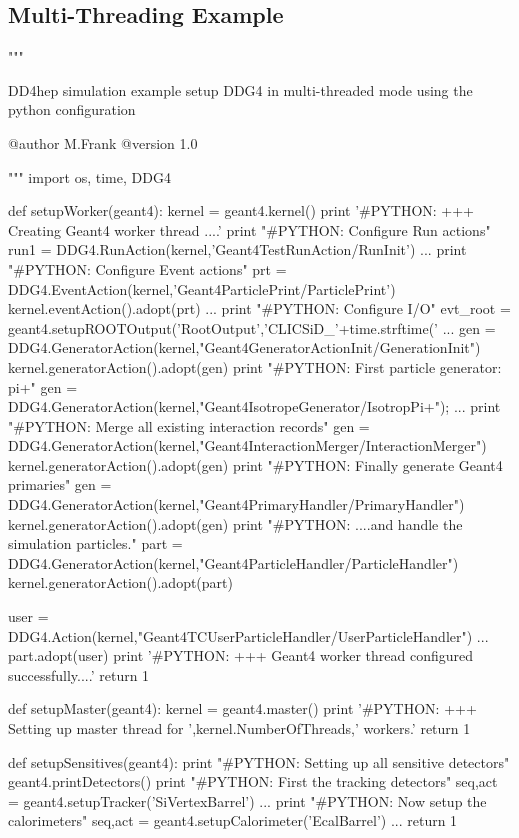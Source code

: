 \subsection{\DDG Multi-Threading Example}
\label{sec:ddg4-multi-threading-example}
\begin{code}
"""

   DD4hep simulation example setup DDG4
   in multi-threaded mode using the python configuration

   @author  M.Frank
   @version 1.0

"""
import os, time, DDG4

def setupWorker(geant4):
  kernel = geant4.kernel()
  print '#PYTHON: +++ Creating Geant4 worker thread ....'
  print "#PYTHON:  Configure Run actions"
  run1 = DDG4.RunAction(kernel,'Geant4TestRunAction/RunInit')
    ...
  print "#PYTHON:  Configure Event actions"
  prt = DDG4.EventAction(kernel,'Geant4ParticlePrint/ParticlePrint')
  kernel.eventAction().adopt(prt)
    ...
  print "\n#PYTHON:  Configure I/O\n"
  evt_root = geant4.setupROOTOutput('RootOutput','CLICSiD_'+time.strftime('%
    ...
  gen = DDG4.GeneratorAction(kernel,"Geant4GeneratorActionInit/GenerationInit")
  kernel.generatorAction().adopt(gen)
  print "#PYTHON:  First particle generator: pi+"
  gen = DDG4.GeneratorAction(kernel,"Geant4IsotropeGenerator/IsotropPi+");
    ...
  print "#PYTHON:  Merge all existing interaction records"
  gen = DDG4.GeneratorAction(kernel,"Geant4InteractionMerger/InteractionMerger")
  kernel.generatorAction().adopt(gen)
  print "#PYTHON:  Finally generate Geant4 primaries"
  gen = DDG4.GeneratorAction(kernel,"Geant4PrimaryHandler/PrimaryHandler")
  kernel.generatorAction().adopt(gen)
  print "#PYTHON:  ....and handle the simulation particles."
  part = DDG4.GeneratorAction(kernel,"Geant4ParticleHandler/ParticleHandler")
  kernel.generatorAction().adopt(part)

  user = DDG4.Action(kernel,"Geant4TCUserParticleHandler/UserParticleHandler")
    ...
  part.adopt(user)
  print '#PYTHON: +++ Geant4 worker thread configured successfully....'
  return 1
  
def setupMaster(geant4):
  kernel = geant4.master()
  print '#PYTHON: +++ Setting up master thread for ',kernel.NumberOfThreads,' workers.'
  return 1

def setupSensitives(geant4):
  print "#PYTHON:  Setting up all sensitive detectors"
  geant4.printDetectors()
  print "#PYTHON:  First the tracking detectors"
  seq,act = geant4.setupTracker('SiVertexBarrel')
    ...
  print "#PYTHON:  Now setup the calorimeters"
  seq,act = geant4.setupCalorimeter('EcalBarrel')
    ...
  return 1


\end{code}

